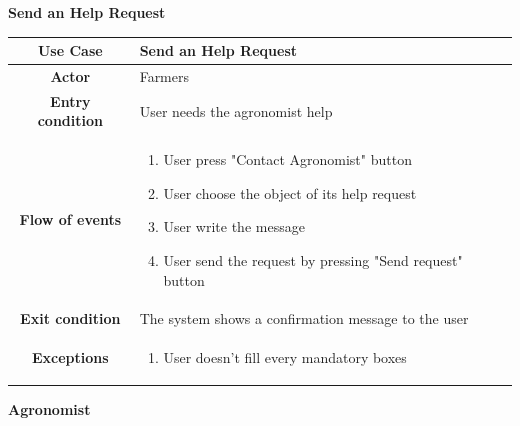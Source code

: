 \documentclass[table, 12pt]{article}
\begin{document}
\begin{itemize}
            \begin{table}[H]
                \item[] \textbf{Send an Help Request}
                \item[] 
                \centering
                \begin{tabular}{|c |m{}|}
                    \hline
                    \textbf{Use Case} & Send an Help Request\\ \hline
                    \textbf{Actor} & Farmers\\ \hline
                    \textbf{Entry condition} & User needs the agronomist help\\  \hline
                    \textbf{Flow of events} & \begin{enumerate}
                                                \item User press "Contact Agronomist" button
                                                \item User choose the object of its help request
                                                \item User write the message
                                                \item User send the request by pressing "Send request" button
                                            \end{enumerate}\\ \hline
                    \textbf{Exit condition} & The system shows a confirmation message to the user \\ \hline
                    \textbf{Exceptions} &  \begin{enumerate}
                        \item User doesn't fill every mandatory boxes 
                    \end{enumerate}\\ \hline                    
                \end{tabular}
            \end{table}

            \newpage
            \item \textbf{Agronomist}
            

\end{itemize}
\end{document}
